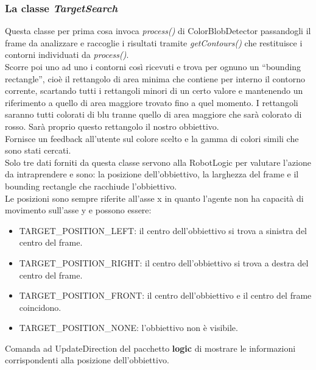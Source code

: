 \subsubsection{La classe \emph{TargetSearch}}
Questa classe per prima cosa invoca \emph{process()} di ColorBlobDetector passandogli
il frame da analizzare e raccoglie i risultati tramite \emph{getContours()} che restituisce 
i contorni individuati da \emph{process()}.\\
Scorre poi uno ad uno i contorni così ricevuti e trova per ognuno un ``bounding rectangle'', 
cioè il rettangolo di area minima che contiene per interno il contorno corrente, 
scartando tutti i rettangoli minori di un certo valore e mantenendo un riferimento 
a quello di area maggiore trovato fino a quel momento. I rettangoli saranno tutti colorati di blu
 tranne quello di area maggiore che sarà colorato di rosso. Sarà proprio questo 
 rettangolo il nostro obbiettivo.\\
 Fornisce un feedback all'utente sul colore scelto e la gamma di colori simili 
 che sono stati cercati.\\
 Solo tre dati forniti da questa classe servono alla RobotLogic per valutare l'azione 
 da intraprendere e sono:
 la posizione dell'obbiettivo, la larghezza del frame e il bounding rectangle 
 che racchiude l'obbiettivo.\\
 Le posizioni sono sempre riferite all'asse x in quanto l'agente non 
 ha capacità di movimento sull'asse y e possono essere:
 \begin{itemize}
	\item TARGET\_POSITION\_LEFT: il centro dell'obbiettivo si trova a sinistra del centro del frame. 
	\item TARGET\_POSITION\_RIGHT: il centro dell'obbiettivo si trova a destra del centro del frame. 
	\item TARGET\_POSITION\_FRONT: il centro dell'obbiettivo e il centro del frame coincidono. 
	\item TARGET\_POSITION\_NONE: l'obbiettivo non è visibile.
\end{itemize}
Comanda ad UpdateDirection del pacchetto \textbf{logic} di mostrare le informazioni 
corrispondenti alla posizione dell'obbiettivo.

